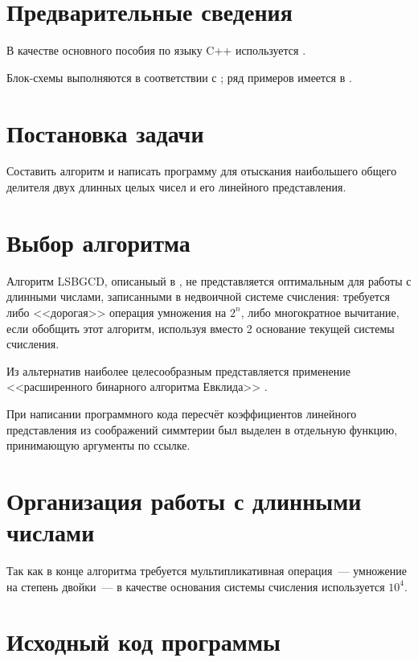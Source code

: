 \documentclass[a4paper,12pt]{article} %
\begin{document}
\setcounter{page}{2}

\section*{Предварительные сведения}

В качестве основного пособия по языку C++ используется \cite{chmyhalo}.


Блок-схемы выполняются в соответствии с \cite{gost-block-scheme};
ряд примеров имеется в \cite{wiki-block-scheme}.


\section*{Постановка задачи}
Составить алгоритм и написать программу
для отыскания наибольшего общего делителя двух длинных целых чисел
и его линейного представления.


\section*{Выбор алгоритма}

Алгоритм LSBGCD, описаныый в \cite{Glukhov},
не представляется оптимальным для работы с длинными числами,
записанными в недвоичной системе счисления:
требуется либо <<дорогая>> операция умножения на $2^n$,
либо многократное вычитание, если обобщить этот алгоритм,
используя вместо 2 основание текущей системы счисления.

Из альтернатив наиболее целесообразным представляется применение
<<расширенного бинарного алгоритма Евклида>> \cite{gcd-binary}.

При написании программного кода пересчёт коэффициентов линейного представления
из соображений симмтерии был выделен в отдельную функцию,
принимающую аргументы по ссылке.

\section*{Организация работы с длинными числами}
Так как в конце алгоритма требуется мультипликативная операция~---
умножение на степень двойки~---
в качестве основания системы счисления используется $10^4$.

\section*{Исходный код программы}






\end{document}
